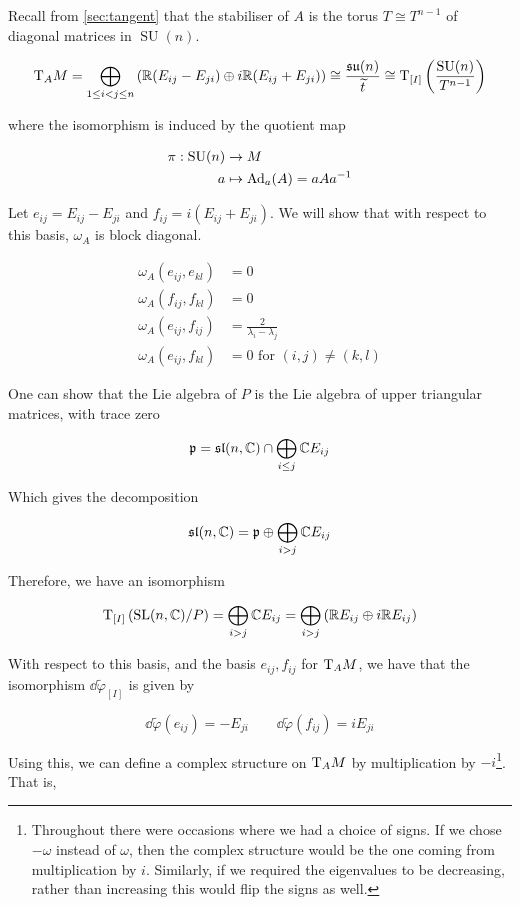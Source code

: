 \documentclass{report}
\DeclareMathOperator{\SU}{SU}
\newcommand{\su}{\mathfrak{su}}
\renewcommand{\sl}{\mathfrak{sl}}
\renewcommand{\tilde}{\widetilde}
\begin{document}
Recall from \cref{sec:tangent} that the stabiliser of \(A\) is the torus \(T \cong T^{n-1}\) of diagonal matrices in \(\SU(n)\).

\[\T_A M = \bigoplus_{1 \le i < j \le n} \left(\R(E_{ij} - E_{ji}) \oplus i\R (E_{ij} + E_{ji})\right) \cong \frac{\su(n)}{\tilde t} \cong \T_{[I]}\left(\frac{\SU(n)}{T^{n-1}}\right)\]

where the isomorphism is induced by the quotient map

\begin{align*}
    \pi : \SU(n) &\to M \\
    a &\mapsto \Ad_a(A) = aAa^{-1}
\end{align*}

Let \(e_{ij} = E_{ij} - E_{ji}\) and \(f_{ij} = i(E_{ij} + E_{ji})\). We will show that with respect to this basis, \(\omega_A\) is block diagonal.

\begin{proposition}
    \label{prop:omega-block-diag}
    \begin{align*}
        \omega_A(e_{ij}, e_{kl}) &= 0 \\
        \omega_A(f_{ij}, f_{kl}) &= 0 \\
        \omega_A(e_{ij}, f_{ij}) &= \frac{2}{\lambda_i - \lambda_j} \\
        \omega_A(e_{ij}, f_{kl}) &= 0 \text{ for }(i, j) \ne (k, l)
    \end{align*}
\end{proposition}

One can show that the Lie algebra of \(P\) is the Lie algebra of upper triangular matrices, with trace zero

\[\mfp = \sl(n, \C) \cap \bigoplus_{i \le j}\C E_{ij}\]

Which gives the decomposition

\[\sl(n, \C) = \mfp \oplus \bigoplus_{i > j}\C E_{ij}\]

Therefore, we have an isomorphism

\[\mathrm{T}_{[I]}\left(\operatorname{SL}(n, \mathbb{C})/P\right) = \bigoplus_{i > j}\mathbb{C} E_{ij} = \bigoplus_{i > j}\left(\mathbb{R} E_{ij} \oplus i\mathbb{R} E_{ij}\right)\]

With respect to this basis, and the basis \(e_{ij}, f_{ij}\) for \(\mathrm{T}_AM\), we have that the isomorphism \(\dd\tilde\varphi_{[I]}\) is given by

\[\dd\tilde\varphi(e_{ij}) = -E_{ji} \qquad \dd\tilde\varphi(f_{ij}) = iE_{ji}\]

Using this, we can define a complex structure on \(\mathrm{T}_AM\) by multiplication by \(-i\)\footnote{Throughout there were occasions where we had a choice of signs. If we chose \(-\omega\) instead of \(\omega\), then the complex structure would be the one coming from multiplication by \(i\). Similarly, if we required the eigenvalues to be decreasing, rather than increasing this would flip the signs as well.}. That is,
\end{document}
